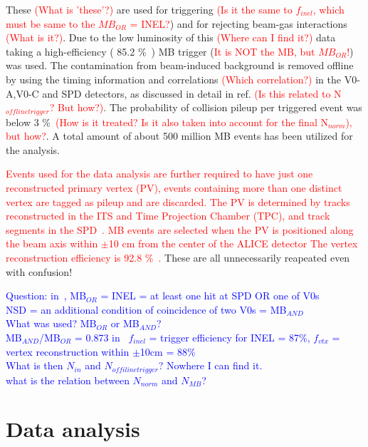 \documentclass[ALICE,manyauthors]{cernphprep}
\newcommand{\red}{\textcolor{red}}
\newcommand{\blue}{\textcolor{blue}}
\begin{document}
These \red{(What is 'these'?)} are used for triggering \red{(Is it the same to $f_{inel}$, which must be same to the $MB_{OR}$ = INEL?}) 
and for rejecting beam-gas interactions \red{(What is it?)}. 
Due to the low luminosity of this \red{(Where can I find it?)} data taking a high-efficiency ( 85.2 \%~\cite{cite:ALICE2015-InclPhot-pp})  
MB trigger (\red{It is NOT the MB, but $MB_{OR}$!}) was used. 
The contamination from beam-induced
background is removed offline by using the timing information and correlations \red{(Which correlation?)} in
the V0-A,V0-C and SPD detectors, as discussed in detail in ref.\cite{cite:ALICEPerformance} \red{(Is this related to N$_{offlinetrigger}$? But how?)}.  
The probability of collision pileup per triggered event was below 3 \%~\cite{cite:ALICE2015-InclPhot-pp}\red{(How is it treated? Is it also taken into 
account for the final N$_{norm}$), but how?}. A total amount of about 500 million MB events has been utilized for the analysis. 

\red{Events used for the data
analysis are further required to have just one reconstructed primary vertex (PV),
events containing more than one distinct  vertex are tagged as pileup and are discarded. 
The PV is determined by tracks reconstructed in the ITS and Time Projection Chamber (TPC), 
and track segments in the SPD~\cite{cite:ALICEPerformance}. 
MB events are selected when 
the  PV is positioned along the beam axis within $\pm$10 cm from the center of the ALICE detector
The vertex reconstruction efficiency is 92.8 \%~\cite{cite:ALICE2015-InclPhot-pp}.}
These are all unnecessarily reapeated even with confusion!

\blue{Question: 
in~\cite{cite:ALICE2015-InclPhot-pp}, MB$_{OR}$ = INEL = at least one hit at SPD OR one of V0s\\
NSD = an additional condition of coincidence of two V0s = MB$_{AND}$\\
What was used? MB$_{OR}$ or MB$_{AND}$? \\
MB$_{AND}$/MB$_{OR}$ = 0.873
in~\cite{cite:NSD, cite:Xi_c} $f_{inel}$ = trigger efficiency for INEL = 87\%, $f_{vtx}$ = vertex reconstruction within $\pm$10cm = 88\%\\
What is then $N_{in}$ and $N_{offilinetrigger}$? Nowhere I can find it.\\
what is the relation between $N_{norm}$ and $N_{MB}$?}

 \section{Data analysis}
 \label{sec:analysis}
\end{document}
